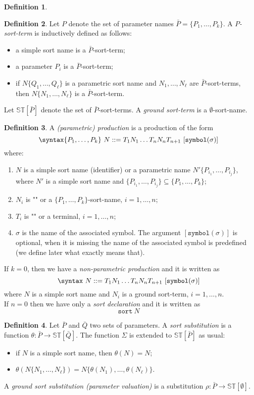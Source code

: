 \documentclass{article}
\theoremstyle{definition}
\theoremstyle{definition}
\theoremstyle{definition}
\newtheorem{definition}{Definition}[section]
\theoremstyle{definition}
\theoremstyle{theorem}
\theoremstyle{theorem}
\theoremstyle{theorem}
\theoremstyle{theorem}
\theoremstyle{theorem}
\newcommand{\KWsymbol}{\texttt{symbol}}
\newcommand{\sort}{\texttt{sort}}
\newcommand{\ST}{\mathbb{ST}}
\begin{document}
{\begin{definition}
\end{definition}

\begin{definition}
Let $P$ denote the set of parameter names $\bar{P}=\{P_1,\ldots,P_k\}$. A \emph{$P$-sort-term} is inductively defined as follows:
\begin{itemize}
\item a simple sort name is a $\bar{P}$-sort-term;
\item a parameter $P_i$ is a $\bar{P}$-sort-term;
\item if $N\{Q_1,\ldots,Q_\ell\}$ is a parametric sort name and $N_1,\ldots,N_\ell$ are $\bar{P}$-sort-terms, then $N\{N_1,\ldots,N_\ell\}$ is a $\bar{P}$-sort-term.
\end{itemize}
Let $\ST[\bar{P}]$ denote the set of $\bar{P}$-sort-terms. A \emph{ground sort-term} is a  $\emptyset$-sort-name.
\end{definition}


\begin{definition}
A \emph{(parametric) production} is a production of the form
\[\syntax\{P_1,\ldots,P_k\}\ N ::= T_1 N_1 \ldots T_n N_n T_{n+1}\ [\KWsymbol(\sigma)]\]
where:
\begin{enumerate}
\item $N$ is a simple sort name (identifier) or a parametric name $N'\{P_{i_1},\ldots,P_{i_j}\}$, where $N'$ is a simple sort name and $\{P_{i_1},\ldots,P_{i_j}\}\subseteq\{P_1,\ldots,P_k\}$;
\item $N_i$ is ""  or a $\{P_1,\ldots,P_k\}$-sort-name, $i=1,\ldots,n$;
\item $T_i$ is "" or a terminal, $i=1,\ldots,n$;
\item $\sigma$ is the name of the associated symbol. The argument $[\KWsymbol(\sigma)]$ is optional, when it is missing the name of the associated symbol is predefined (we define later what exactly means that).
\end{enumerate}
If $k=0$, then we have a \emph{non-parametric production} and it is written as
\[\syntax\ N ::= T_1 N_1 \ldots T_n N_n T_{n+1}\ [\KWsymbol(\sigma)]\]
where $N$ is a simple sort name and $N_i$ is a ground sort-term, $i=1,\ldots,n$.
\\
If $n=0$ then we have only a \emph{sort declaration} and it is written as
\[\sort\ N \]
\end{definition}

\begin{definition}
Let $\bar{P}$ and $\bar{Q}$ two sets of parameters. A \emph{sort substitution} is a function $\theta:\bar{P}\to \ST[\bar{Q}]$. The function $\Sigma$ is extended to $\ST[\bar{P}]$ as usual:
\begin{itemize}
\item if $N$ is a simple sort name, then $\theta(N)=N$;
\item $\theta(N\{N_1,\ldots,N_\ell\})=N\{\theta(N_1),\ldots,\theta(N_\ell)\}$.
\end{itemize}
A \emph{ground sort substitution (parameter valuation)} is a substitution $\rho:\bar{P}\to \ST[\emptyset]$.
\end{definition}

}
\end{document}
